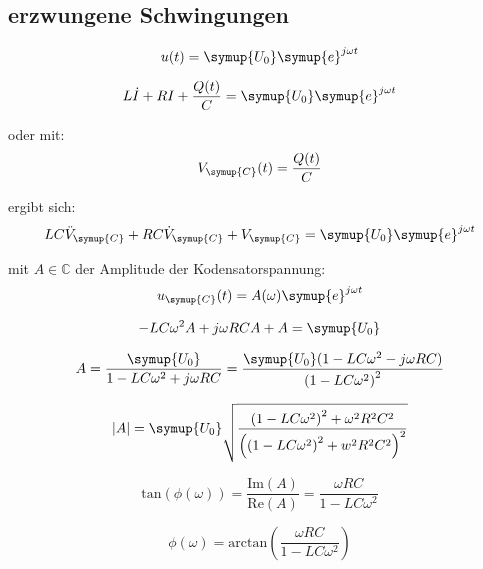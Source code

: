     \subsection{erzwungene Schwingungen}

    \begin{equation}
        u(t)= \symup{U_0} \symup{e}^{j \omega t}
    \end{equation}

    \begin{equation}
        L \dot{I} + R I + \frac{Q(t)}{C} = \symup{U_0} \symup{e}^{j \omega t}
    \end{equation}

    oder mit:
    \begin{equation}
        V_{\symup{C}} (t) = \frac{Q(t)}{C}
    \end{equation}

    ergibt sich:
    \begin{equation}
        LC \ddot{V}_{\symup{C}} + RC \dot{V}_{\symup{C}} + V_{\symup{C}} = \symup{U_0} \symup{e}^{j \omega t}
    \end{equation}

    mit $A \in  \mathds{C}$ der Amplitude der Kodensatorspannung:
    \begin{equation}
        u_{\symup{C}} (t) = A(\omega) \symup{e}^{j \omega t}
    \end{equation}

    \begin{equation}
        -LC \omega^2 A + j\omega RC A +A = \symup{U_0}
    \end{equation}

    \begin{equation}
        A= \frac{\symup{U_0}}{1 - LC \omega^2 + j \omega RC} = \frac{ \symup{U_0}(1 -LC \omega^2 - j\omega RC)}{\left( 1- LC \omega^2 \right)^2}
    \end{equation}
    
    \begin{equation}
        |A|= \symup{U_0} \sqrt{\frac{\left(1-LC\omega^2\right)^2 + \omega^2 R^2C^2}{\left( \left(1 -LC \omega^2\right)^2 +w^2R^2C^2 \right)^2}}
    \end{equation}

    \begin{equation}
        \text{tan}(\phi (\omega)) = \frac{\text{Im}(A)}{\text{Re}(A)} = \frac{\omega RC}{1 - LC\omega^2}
    \end{equation}

    \begin{equation}
        \phi (\omega) = \text{arctan}\left(\frac{\omega RC}{1 - LC\omega^2} \right)
    \end{equation}

